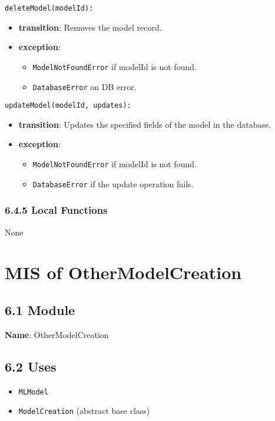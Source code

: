 \documentclass[12pt, titlepage]{article}
\begin{document}
\noindent \texttt{deleteModel(modelId):}
\begin{itemize}
    \item \textbf{transition}: Removes the model record.
    \item \textbf{exception}:
    \begin{itemize}
        \item \texttt{ModelNotFoundError} if modelId is not found.
        \item \texttt{DatabaseError} on DB error.
    \end{itemize}
\end{itemize}

\noindent \texttt{updateModel(modelId, updates):}
\begin{itemize}
    \item \textbf{transition}: Updates the specified fields of the model in the database.
    \item \textbf{exception}:
    \begin{itemize}
        \item \texttt{ModelNotFoundError} if modelId is not found.
        \item \texttt{DatabaseError} if the update operation fails.
    \end{itemize}
\end{itemize}

\subsubsection{6.4.5 Local Functions}
None

\newpage


\section{MIS of OtherModelCreation}
\label{sec:OtherModelCreation}

\subsection{6.1 Module}
\textbf{Name}: OtherModelCreation

\subsection{6.2 Uses}
\begin{itemize}
    \item \texttt{MLModel}
    \item \texttt{ModelCreation} (abstract base class)
\end{itemize}
\end{document}
